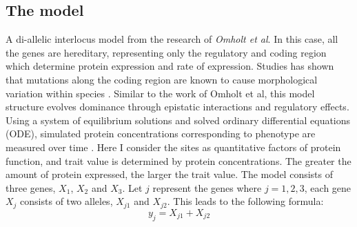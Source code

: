 \subsection{The model}
A di-allelic interlocus model from the research of \textit{Omholt et al}. In this case, all the genes are hereditary, representing only the regulatory and coding region which determine protein expression and rate of expression. Studies has shown that mutations along the coding region are known to cause morphological variation within species \cite{stern2009genetic}. Similar to the work of Omholt et al, this model structure evolves dominance through epistatic interactions and regulatory effects. Using a system of equilibrium solutions and solved ordinary differential equations (ODE), simulated protein concentrations corresponding to phenotype are measured over time \cite{omholt2000gene}. Here I consider the sites as quantitative factors of protein function, and trait value is determined by protein concentrations. The greater the amount of protein expressed, the larger the trait value. The model consists of three genes, $X_1$, $X_2$ and $X_3$. Let \(j\) represent the genes where $j = {1,2,3}$, each gene $X_j$ consists of two alleles, $X_{j1}$ and $X_{j2}$. This leads to the following formula:
\begin{equation*}
    y_j = X_{j1}  + X_{j2} \label{eq:Protein Expression} \tag{1}
\end{equation*}
